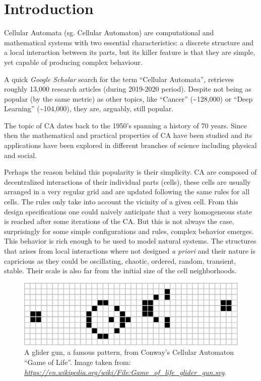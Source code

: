 \documentclass[
  openany]{book}
\begin{document}
\hypertarget{introduction-1}{%
\section{Introduction}\label{introduction-1}}

Cellular Automata (sg. Cellular Automaton) are computational and mathematical systems with two essential characteristics: a discrete structure and a local interaction between its parts, but its killer feature is that they are simple, yet capable of producing complex behaviour.

A quick \emph{Google Scholar} search for the term ``Cellular Automata'', retrieves roughly 13,000 research articles (during 2019-2020 period). Despite not being as popular (by the same metric) as other topics, like ``Cancer'' (\textasciitilde128,000) or ``Deep Learning'' (\textasciitilde104,000), they are, arguably, still popular.

The topic of CA dates back to the 1950's spanning a history of 70 years. Since then the mathematical and practical properties of CA have been studied and its applications have been explored in different branches of science including physical and social.

Perhaps the reason behind this popularity is their simplicity. CA are composed of decentralized interactions of their individual parts (cells), these cells are usually arranged in a very regular grid and are updated following the same rules for all cells. The rules only take into account the vicinity of a given cell. From this design specifications one could naively anticipate that a very homogeneous state is reached after some iterations of the CA. But this is not always the case, surprisingly for some simple configurations and rules, complex behavior emerges. This behavior is rich enough to be used to model natural systems. The structures that arises from local interactions where not designed \emph{a priori} and their nature is capricious as they could be oscillating, chaotic, ordered, random, transient, stable. Their scale is also far from the initial size of the cell neighborhoods.



\begin{figure}

{\centering \includegraphics[width=0.8\linewidth]{pics/Game_of_life_glider_gun} 

}

\caption{A glider gun, a famous pattern, from Conway's Cellular Automaton ``Game of Life''. Image taken from: \emph{\url{https://en.wikipedia.org/wiki/File:Game_of_life_glider_gun.svg}}.}\label{fig:CA-example}
\end{figure}
\end{document}
